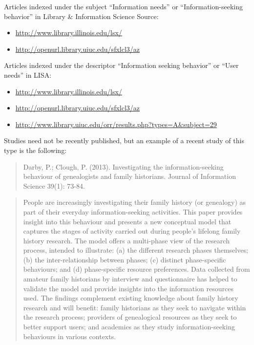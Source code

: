 \documentclass[]{article}
\providecommand{\tightlist}{%
  \setlength{\itemsep}{0pt}\setlength{\parskip}{0pt}}
\begin{document}
Articles indexed under the subject ``Information needs'' or
``Information-seeking behavior'' in Library \& Information Science
Source:

\begin{itemize}
\tightlist
\item
  \url{http://www.library.illinois.edu/lsx/}
\item
  \url{http://openurl.library.uiuc.edu/sfxlcl3/az}
\end{itemize}

Articles indexed under the descriptor ``Information seeking behavior''
or ``User needs'' in LISA:

\begin{itemize}
\tightlist
\item
  \url{http://www.library.illinois.edu/lsx/}
\item
  \url{http://openurl.library.uiuc.edu/sfxlcl3/az}
\item
  \url{http://www.library.uiuc.edu/orr/results.php?types=A\&subject=29}
\end{itemize}

Studies need not be recently published, but an example of a recent study
of this type is the following:

\begin{quote}
Darby, P.; Clough, P. (2013). Investigating the information-seeking
behaviour of genealogists and family historians. Journal of Information
Science 39(1): 73-84.
\end{quote}

\begin{quote}
People are increasingly investigating their family history (or
genealogy) as part of their everyday information-seeking activities.
This paper provides insight into this behaviour and presents a new
conceptual model that captures the stages of activity carried out during
people's lifelong family history research. The model offers a
multi-phase view of the research process, intended to illustrate: (a)
the different research phases themselves; (b) the inter-relationship
between phases; (c) distinct phase-specific behaviours; and (d)
phase-specific resource preferences. Data collected from amateur family
historians by interview and questionnaire has helped to validate the
model and provide insights into the information resources used. The
findings complement existing knowledge about family history research and
will benefit: family historians as they seek to navigate within the
research process; providers of genealogical resources as they seek to
better support users; and academics as they study information-seeking
behaviours in various contexts.
\end{quote}
\end{document}
